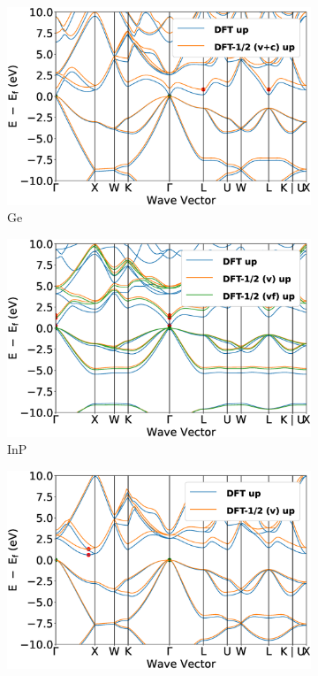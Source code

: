\begin{figure}[!ht]
\begin{subfigure}{0.3\textwidth}
  \includegraphics[width=\linewidth]{images/band_3d_Ge.eps}
  \caption{Ge}
\end{subfigure}\hfil %
\begin{subfigure}{0.3\textwidth}
  \includegraphics[width=\linewidth]{images/band_3d_InP.eps}
  \caption{InP}
\end{subfigure}\hfil %
\begin{subfigure}{0.3\textwidth}
  \includegraphics[width=\linewidth]{images/band_3d_Si.eps}

\end{subfigure}
\end{figure}
